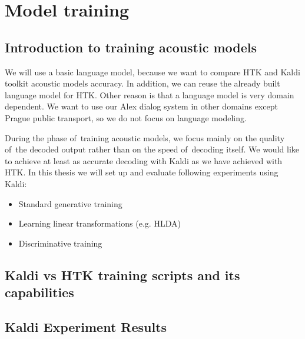 \chapter{Model training}
\label{cha:training}


\section{Introduction to training acoustic models} 
\label{sec:introduction_to_training_acoustic_models}
We will use a basic language model, because we want to compare \ac{HTK} and Kaldi 
toolkit acoustic models accuracy.  In addition, we can reuse the already built 
language model for \ac{HTK}. Other reason is that a language model is very domain 
dependent. %
We want to use our Alex dialog system in other domains except Prague public 
transport, so we do not focus on language modeling. 

During the phase of~training acoustic models, we focus mainly on the quality 
of~the decoded output rather than on the speed of~decoding itself. 
We would like to achieve at least as accurate decoding with Kaldi as we have 
achieved with \ac{HTK}. In this thesis we will set up and evaluate following 
experiments using Kaldi:
\begin{itemize}
    \item Standard generative training
    \item Learning linear transformations (e.g. \ac{HLDA})
    \item Discriminative training 
\end{itemize}


\section[Kaldi vs \ac{HTK}]{Kaldi vs \ac{HTK} training scripts and its capabilities} 
\label{sec:kaldi_htk}


\section{Kaldi Experiment Results} %
\label{sec:exp_results}

